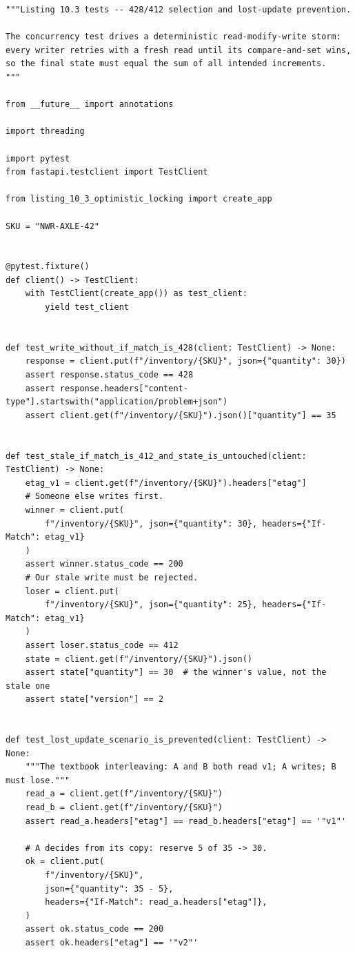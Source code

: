 \begin{verbatim}
"""Listing 10.3 tests -- 428/412 selection and lost-update prevention.

The concurrency test drives a deterministic read-modify-write storm:
every writer retries with a fresh read until its compare-and-set wins,
so the final state must equal the sum of all intended increments.
"""

from __future__ import annotations

import threading

import pytest
from fastapi.testclient import TestClient

from listing_10_3_optimistic_locking import create_app

SKU = "NWR-AXLE-42"


@pytest.fixture()
def client() -> TestClient:
    with TestClient(create_app()) as test_client:
        yield test_client


def test_write_without_if_match_is_428(client: TestClient) -> None:
    response = client.put(f"/inventory/{SKU}", json={"quantity": 30})
    assert response.status_code == 428
    assert response.headers["content-type"].startswith("application/problem+json")
    assert client.get(f"/inventory/{SKU}").json()["quantity"] == 35


def test_stale_if_match_is_412_and_state_is_untouched(client: TestClient) -> None:
    etag_v1 = client.get(f"/inventory/{SKU}").headers["etag"]
    # Someone else writes first.
    winner = client.put(
        f"/inventory/{SKU}", json={"quantity": 30}, headers={"If-Match": etag_v1}
    )
    assert winner.status_code == 200
    # Our stale write must be rejected.
    loser = client.put(
        f"/inventory/{SKU}", json={"quantity": 25}, headers={"If-Match": etag_v1}
    )
    assert loser.status_code == 412
    state = client.get(f"/inventory/{SKU}").json()
    assert state["quantity"] == 30  # the winner's value, not the stale one
    assert state["version"] == 2


def test_lost_update_scenario_is_prevented(client: TestClient) -> None:
    """The textbook interleaving: A and B both read v1; A writes; B must lose."""
    read_a = client.get(f"/inventory/{SKU}")
    read_b = client.get(f"/inventory/{SKU}")
    assert read_a.headers["etag"] == read_b.headers["etag"] == '"v1"'

    # A decides from its copy: reserve 5 of 35 -> 30.
    ok = client.put(
        f"/inventory/{SKU}",
        json={"quantity": 35 - 5},
        headers={"If-Match": read_a.headers["etag"]},
    )
    assert ok.status_code == 200
    assert ok.headers["etag"] == '"v2"'


\end{verbatim}
